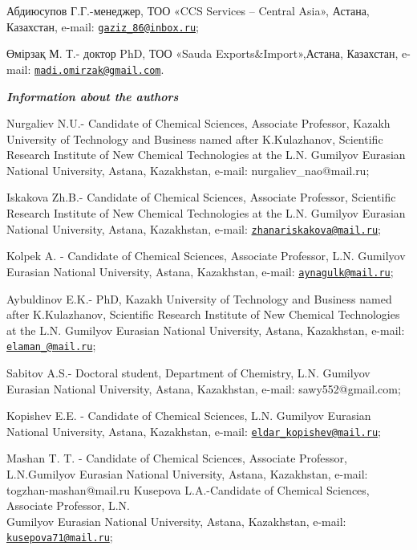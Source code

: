 \begin{authorinfo}
Абдиюсупов Г.Г.-менеджер, ТОО «CCS Services -- Central Asia», Астана,
Казахстан, e-mail:
\href{mailto:gaziz_86@inbox.ru}{\nolinkurl{gaziz\_86@inbox.ru}};

Өмірзақ М. Т.- доктор PhD, ТОО «Sauda Exports\&Import»,Астана,
Казахстан, e-mail:
\href{mailto:madi.omirzak@gmail.com}{\nolinkurl{madi.omirzak@gmail.com}}.

\hspace{1em}\emph{{\bfseries Information about the authors}}

Nurgaliev N.U.- Candidate of Chemical Sciences, Associate Professor,
Kazakh University of Technology and Business named after K.Kulazhanov,
Scientific Research Institute of New Chemical Technologies at the L.N.
Gumilyov Eurasian National University, Astana, Kazakhstan, e-mail:
nurgaliev\_nao@mail.ru;

Iskakova Zh.B.- Candidate of Chemical Sciences, Associate Professor,
Scientific Research Institute of New Chemical Technolo\-gies at the L.N.
Gumilyov Eurasian National University, Astana, Kazakhstan, e-mail:
\href{mailto:zhanariskakova@mail.ru}{\nolinkurl{zhanariskakova@mail.ru}};

Kolpek A. - Candidate of Chemical Sciences, Associate Professor, L.N.
Gumilyov Eurasian National University, Astana, Kazakhstan, e-mail:
\href{mailto:aynagulk@mail.ru}{\nolinkurl{aynagulk@mail.ru}};

Aybuldinov E.K.- PhD, Kazakh University of Technology and Business named
after K.Kulazhanov, Scientific Research Institute of New Chemical
Technologies at the L.N. Gumilyov Eurasian National University, Astana,
Kazakhstan, e-mail:\\
\href{mailto:elaman_@mail.ru}{\nolinkurl{elaman\_@mail.ru}};

Sabitov A.S.- Doctoral student, Department of Chemistry, L.N. Gumilyov
Eurasian National University, Astana, Kazakhstan, e-mail:
sawy552@gmail.com;

Kopishev E.E. - Candidate of Chemical Sciences, L.N. Gumilyov Eurasian
National University, Astana, Kazakhstan, e-mail:
\href{mailto:eldar_kopishev@mail.ru}{\nolinkurl{eldar\_kopishev@mail.ru}};

Mashan T. T. - Candidate of Chemical Sciences, Associate Professor,
L.N.Gumilyov Eurasian National University, Astana, Kazakhstan, e-mail:
togzhan-mashan@mail.ru Kusepova L.A.-Candidate of Chemical Sciences,
Associate Professor, L.N. \\Gumilyov Eurasian National University, Astana,
Kazakhstan, e-mail:
\href{mailto:kusepova71@mail.ru}{\nolinkurl{kusepova71@mail.ru}};


\end{authorinfo}
